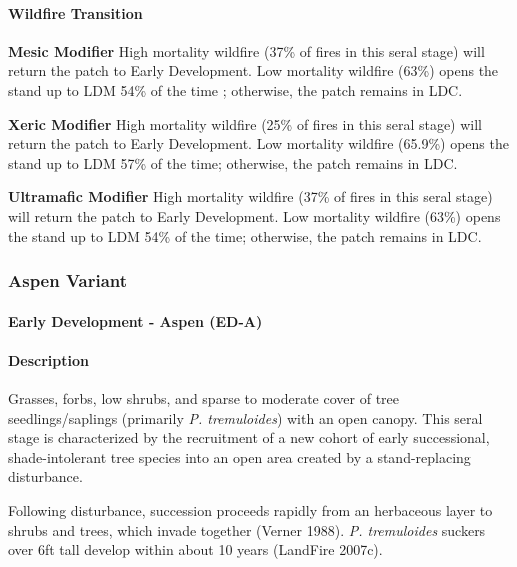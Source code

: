 \paragraph{Wildfire Transition}

\begin{adjustwidth}{2cm}{}
\textbf{Mesic Modifier } High mortality wildfire (37\% of fires in this seral stage) will return the patch to Early Development. Low mortality wildfire (63\%) opens the stand up to LDM 54\% of the time ; otherwise, the patch remains in LDC. 

\medskip
\noindent \textbf{Xeric Modifier} High mortality wildfire (25\% of fires in this seral stage) will return the patch to Early Development. Low mortality wildfire (65.9\%) opens the stand up to LDM 57\% of the time; otherwise, the patch remains in LDC.

\medskip
\noindent \textbf{Ultramafic Modifier} High mortality wildfire (37\% of fires in this seral stage) will return the patch to Early Development. Low mortality wildfire (63\%) opens the stand up to LDM 54\% of the time; otherwise, the patch remains in LDC.

\end{adjustwidth}

\noindent\hrulefill
\noindent\hrulefill

\subsubsection{Aspen Variant}

\paragraph{Early Development - Aspen (ED-A)}

\paragraph{Description} Grasses, forbs, low shrubs, and sparse to moderate cover of tree seedlings/saplings (primarily \emph{P. tremuloides}) with an open canopy. This seral stage is characterized by the recruitment of a new cohort of early successional, shade-intolerant tree species into an open area created by a stand-replacing disturbance.

Following disturbance, succession proceeds rapidly from an herbaceous layer to shrubs and trees, which invade together (Verner 1988). \emph{P. tremuloides} suckers over 6ft tall develop within about 10 years (LandFire 2007c). 



